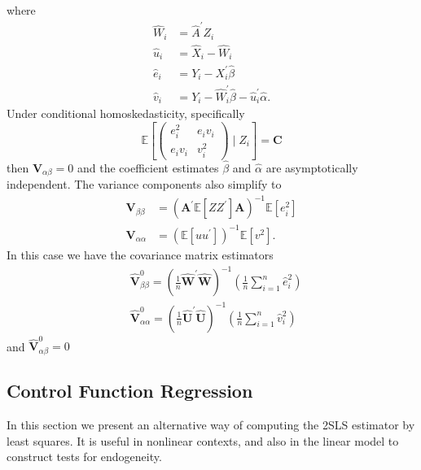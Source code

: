 \documentclass[10pt]{article}
\begin{document}
where
$$
\begin{aligned}
\widehat{W}_{i} &=\widehat{A}^{\prime} Z_{i} \\
\widehat{u}_{i} &=\widehat{X}_{i}-\widehat{W}_{i} \\
\widehat{e}_{i} &=Y_{i}-X_{i}^{\prime} \widehat{\beta} \\
\widehat{v}_{i} &=Y_{i}-\widehat{W}_{i}^{\prime} \widehat{\beta}-\widehat{u}_{i}^{\prime} \widehat{\alpha} .
\end{aligned}
$$
Under conditional homoskedasticity, specifically
$$
\mathbb{E}\left[\left(\begin{array}{cc}
e_{i}^{2} & e_{i} v_{i} \\
e_{i} v_{i} & v_{i}^{2}
\end{array}\right) \mid Z_{i}\right]=\boldsymbol{C}
$$
then $\boldsymbol{V}_{\alpha \beta}=0$ and the coefficient estimates $\widehat{\beta}$ and $\widehat{\alpha}$ are asymptotically independent. The variance components also simplify to
$$
\begin{aligned}
\boldsymbol{V}_{\beta \beta} &=\left(\boldsymbol{A}^{\prime} \mathbb{E}\left[Z Z^{\prime}\right] \boldsymbol{A}\right)^{-1} \mathbb{E}\left[e_{i}^{2}\right] \\
\boldsymbol{V}_{\alpha \alpha} &=\left(\mathbb{E}\left[u u^{\prime}\right]\right)^{-1} \mathbb{E}\left[v^{2}\right] .
\end{aligned}
$$
In this case we have the covariance matrix estimators
$$
\begin{aligned}
&\widehat{\boldsymbol{V}}_{\beta \beta}^{0}=\left(\frac{1}{n} \widehat{\boldsymbol{W}}^{\prime} \widehat{\boldsymbol{W}}\right)^{-1}\left(\frac{1}{n} \sum_{i=1}^{n} \widehat{e}_{i}^{2}\right) \\
&\widehat{\boldsymbol{V}}_{\alpha \alpha}^{0}=\left(\frac{1}{n} \widehat{\boldsymbol{U}}^{\prime} \widehat{\boldsymbol{U}}\right)^{-1}\left(\frac{1}{n} \sum_{i=1}^{n} \widehat{v}_{i}^{2}\right)
\end{aligned}
$$
and $\widehat{\boldsymbol{V}}_{\alpha \beta}^{0}=0$

\subsection{Control Function Regression}
In this section we present an alternative way of computing the 2SLS estimator by least squares. It is useful in nonlinear contexts, and also in the linear model to construct tests for endogeneity.
\end{document}
